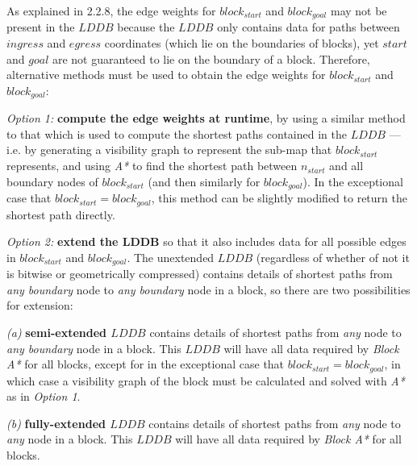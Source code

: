 \documentclass[12pt,notitlepage]{report}
\begin{document}
\noindent
As explained in 2.2.8, the edge weights for $block_{start}$ and $block_{goal}$ may not be present in the $LDDB$ because the $LDDB$ only contains data for paths between $ingress$ and $egress$ coordinates (which lie on the boundaries of blocks), yet $start$ and $goal$ are not guaranteed to lie on the boundary of a block. Therefore, alternative methods must be used to obtain the edge weights for $block_{start}$ and $block_{goal}$:
\begin{description}
\item {\em Option 1:} {\bfseries compute the edge weights at runtime}, by using a similar method to that which is used to compute the shortest paths contained in the $LDDB$ --- i.e. by generating a visibility graph to represent the sub-map that $block_{start}$ represents, and using {\em A*} to find the shortest path between $n_{start}$ and all boundary nodes of $block_{start}$ (and then similarly for $block_{goal}$). In the exceptional case that $block_{start} = block_{goal}$, this method can be slightly modified to return the shortest path directly. 
\item {\em Option 2:} {\bfseries extend the LDDB} so that it also includes data for all possible edges in $block_{start}$ and $block_{goal}$. The unextended $LDDB$ (regardless of whether of not it is bitwise or geometrically compressed) contains details of shortest paths from {\em any boundary} node to {\em any boundary} node in a block, so there are two possibilities for extension:
  \begin{description}
  \item{\em (a)} {\bf semi-extended $LDDB$} contains details of shortest paths from {\em any} node to {\em any boundary} node in a block. This $LDDB$ will have all data required by {\em Block A*} for all blocks, except for in the exceptional case that $block_{start} = block_{goal}$, in which case a visibility graph of the block must be calculated and solved with {\em A*} as in {\em Option 1}.
  \item{\em (b)} {\bf fully-extended $LDDB$} contains details of shortest paths from {\em any} node to {\em any} node in a block. This $LDDB$ will have all data required by {\em Block A*} for all blocks.
  \end{description} 
\end{description}
\end{document}
